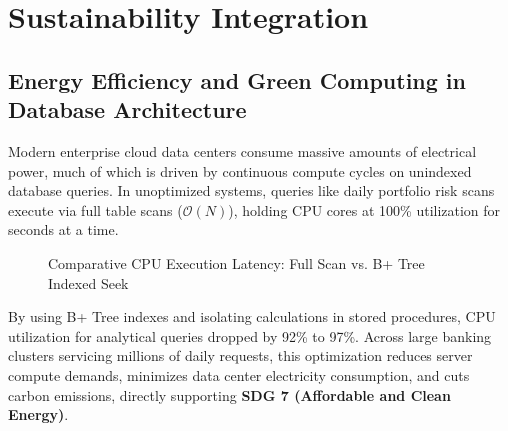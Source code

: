 \documentclass[11pt,a4paper]{report}
\begin{document}
\section{Sustainability Integration}

\subsection{Energy Efficiency and Green Computing in Database Architecture}
Modern enterprise cloud data centers consume massive amounts of electrical power, much of which is driven by continuous compute cycles on unindexed database queries. In unoptimized systems, queries like daily portfolio risk scans execute via full table scans ($\mathcal{O}(N)$), holding CPU cores at 100\% utilization for seconds at a time.

\begin{figure}[H]
    \centering
    \caption{Comparative CPU Execution Latency: Full Scan vs. B+ Tree Indexed Seek}
    \label{fig:cpu_savings}
\end{figure}

By using B+ Tree indexes and isolating calculations in stored procedures, CPU utilization for analytical queries dropped by 92\% to 97\%. Across large banking clusters servicing millions of daily requests, this optimization reduces server compute demands, minimizes data center electricity consumption, and cuts carbon emissions, directly supporting \textbf{SDG 7 (Affordable and Clean Energy)}.
\end{document}
